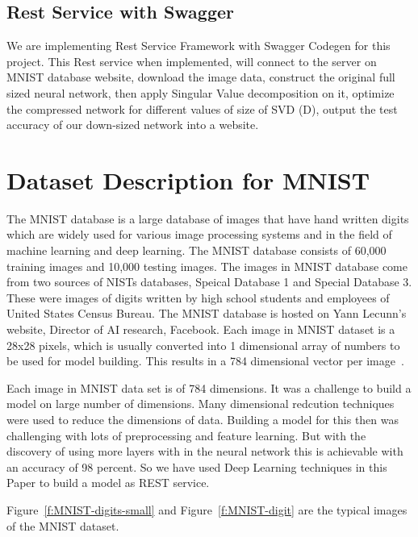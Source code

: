 \subsection{Rest Service with Swagger}

We are implementing Rest Service Framework with Swagger Codegen for this
project. This Rest service when implemented, will connect to the server on MNIST
database website, download the image data, construct the original full sized
neural network, then apply Singular Value decomposition on it, optimize the
compressed network for different values of size of SVD (D), output the test
accuracy of our down-sized network into a website.

\section{Dataset Description for MNIST}

The MNIST database is a large database of images that have hand written digits
which are widely used for various image processing systems and in the field of
machine learning and deep learning. The MNIST database consists of 60,000
training images and 10,000 testing images. The images in MNIST database come
from two sources of NISTs databases, Speical Database 1 and Special Database
3. These were images of digits written by high school students and employees
of United States Census Bureau. The MNIST database is hosted on  Yann Lecunn's
website, Director of AI research, Facebook. Each image in MNIST dataset is a
28x28 pixels, which is usually converted into 1 dimensional array of numbers
to be used for model building. This results in a 784 dimensional vector per
image~\cite{hid-sp18-401-MNIST-dataset}.

Each image in MNIST data set is of 784 dimensions. It was a challenge to build a
model on large number of dimensions. Many dimensional redcution techniques were
used to reduce the dimensions of data. Building a model for this then was
challenging with lots of preprocessing and feature learning. But with the
discovery of using more layers with in the neural network this is achievable
with an accuracy of 98 percent. So we have used Deep Learning techniques in this
Paper to build a model as REST service.

Figure~\ref{f:MNIST-digits-small} and Figure~\ref{f:MNIST-digit} are the typical 
images of the MNIST dataset.

